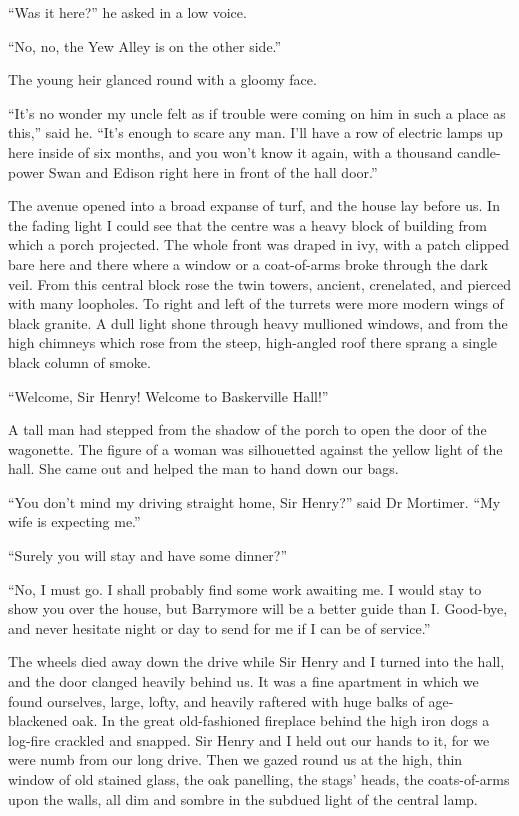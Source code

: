 \documentclass[paper=a5,BCOR=7mm,twoside,DIV=calc,12pt,usegeometry,openany,chapterprefix,endperiod,headings=big]{scrbook} %
\begin{document}
\enquote{Was it here?} he asked in a low voice.

\enquote{No, no, the Yew Alley is on the other side.}

The young heir glanced round with a gloomy face.

\enquote{It's no wonder my uncle felt as if trouble were coming on him in such a place as this,} said he. \enquote{It's enough to scare any man. I'll have a row of electric lamps up here inside of six months, and you won't know it again, with a thousand candle-power Swan and Edison right here in front of the hall door.}

The avenue opened into a broad expanse of turf, and the house lay before us. In the fading light I could see that the centre was a heavy block of building from which a porch projected. The whole front was draped in ivy, with a patch clipped bare here and there where a window or a coat-of-arms broke through the dark veil. From this central block rose the twin towers, ancient, crenelated, and pierced with many loopholes. To right and left of the turrets were more modern wings of black granite. A dull light shone through heavy mullioned windows, and from the high chimneys which rose from the steep, high-angled roof there sprang a single black column of smoke.

\enquote{Welcome, Sir Henry! Welcome to Baskerville Hall!}

A tall man had stepped from the shadow of the porch to open the door of the wagonette. The figure of a woman was silhouetted against the yellow light of the hall. She came out and helped the man to hand down our bags.

\enquote{You don't mind my driving straight home, Sir Henry?} said Dr Mortimer. \enquote{My wife is expecting me.}

\enquote{Surely you will stay and have some dinner?}

\enquote{No, I must go. I shall probably find some work awaiting me. I would stay to show you over the house, but Barrymore will be a better guide than I. Good-bye, and never hesitate night or day to send for me if I can be of service.}

The wheels died away down the drive while Sir Henry and I turned into the hall, and the door clanged heavily behind us. It was a fine apartment in which we found ourselves, large, lofty, and heavily raftered with huge balks of age-blackened oak. In the great old-fashioned fireplace behind the high iron dogs a log-fire crackled and snapped. Sir Henry and I held out our hands to it, for we were numb from our long drive. Then we gazed round us at the high, thin window of old stained glass, the oak panelling, the stags' heads, the coats-of-arms upon the walls, all dim and sombre in the subdued light of the central lamp.
\end{document}
